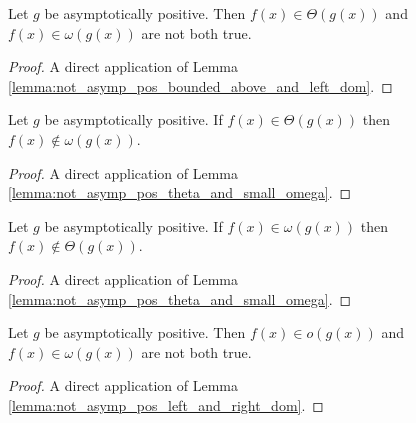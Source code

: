 \begin{lemma}
    \label{lemma:not_asymp_pos_theta_and_small_omega}
    \leanok
    Let $g$ be asymptotically positive. Then $f(x) \in \Theta(g(x))$ and 
    $f(x) \in \omega(g(x))$ are not both true.
\end{lemma}

\begin{proof}
    \leanok
    A direct application of Lemma \ref{lemma:not_asymp_pos_bounded_above_and_left_dom}.
\end{proof}

\begin{lemma}
    \label{lemma:not_asymp_pos_small_omega_of_theta}
    \leanok
    Let $g$ be asymptotically positive. If $f(x) \in \Theta(g(x))$ then $f(x) \notin \omega(g(x))$.
\end{lemma}

\begin{proof}
    \leanok
    A direct application of Lemma \ref{lemma:not_asymp_pos_theta_and_small_omega}.
\end{proof}

\begin{lemma}
    \label{lemma:not_asymp_pos_theta_of_small_omega}
    \leanok
    Let $g$ be asymptotically positive. If $f(x) \in \omega(g(x))$ then $f(x) \notin \Theta(g(x))$.
\end{lemma}

\begin{proof}
    \leanok
    A direct application of Lemma \ref{lemma:not_asymp_pos_theta_and_small_omega}.
\end{proof}

\begin{lemma}
    \label{lemma:not_asymp_pos_o_and_small_omega}
    \leanok
    Let $g$ be asymptotically positive. Then $f(x) \in o(g(x))$ and 
    $f(x) \in \omega(g(x))$ are not both true.
\end{lemma}

\begin{proof}
    \leanok
    A direct application of Lemma \ref{lemma:not_asymp_pos_left_and_right_dom}.
\end{proof}


